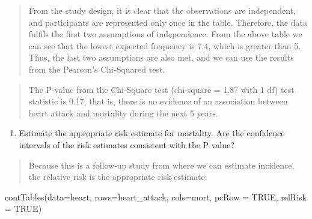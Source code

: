 \documentclass[
]{memoir}
\newenvironment{Shaded}{\begin{snugshade}}{\end{snugshade}}
\newcommand{\AttributeTok}[1]{\textcolor[rgb]{0.77,0.63,0.00}{#1}}
\newcommand{\ConstantTok}[1]{\textcolor[rgb]{0.00,0.00,0.00}{#1}}
\newcommand{\FunctionTok}[1]{\textcolor[rgb]{0.00,0.00,0.00}{#1}}
\newcommand{\NormalTok}[1]{#1}
\providecommand{\tightlist}{%
  \setlength{\itemsep}{0pt}\setlength{\parskip}{0pt}}
\begin{document}
\begin{quote}
From the study design, it is clear that the observations are independent, and participants are represented only once in the table. Therefore, the data fulfils the first two assumptions of independence. From the above table we can see that the lowest expected frequency is 7.4, which is greater than 5. Thus, the last two assumptions are also met, and we can use the results from the Pearson's Chi-Squared test.
\end{quote}

\begin{quote}
The P-value from the Chi-Square test (chi-square = 1.87 with 1 df) test statistic is 0.17, that is, there is no evidence of an association between heart attack and mortality during the next 5 years.
\end{quote}

\begin{enumerate}
\def\labelenumi{\alph{enumi})}
\setcounter{enumi}{2}
\tightlist
\item
  Estimate the appropriate risk estimate for mortality. Are the confidence intervals of the risk estimates consistent with the P value?
\end{enumerate}

\begin{quote}
Because this is a follow-up study from where we can estimate incidence, the relative risk is the appropriate risk estimate:
\end{quote}

\begin{Shaded}
\begin{Highlighting}[]
\FunctionTok{contTables}\NormalTok{(}\AttributeTok{data=}\NormalTok{heart, }\AttributeTok{rows=}\NormalTok{heart\_attack, }\AttributeTok{cols=}\NormalTok{mort,}
           \AttributeTok{pcRow =} \ConstantTok{TRUE}\NormalTok{, }\AttributeTok{relRisk =} \ConstantTok{TRUE}\NormalTok{)}
\end{Highlighting}
\end{Shaded}
\end{document}
